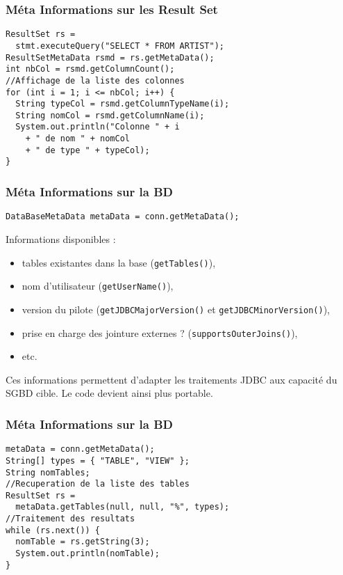 \documentclass[xcolor=pdftex,x11names,table]{beamer}
\begin{document}
		\begin{frame}[fragile]
    \frametitle{Méta Informations sur les Result Set}
      \begin{block}{}
    	  \begin{lstlisting}
ResultSet rs = 
  stmt.executeQuery("SELECT * FROM ARTIST");
ResultSetMetaData rsmd = rs.getMetaData();
int nbCol = rsmd.getColumnCount();
//Affichage de la liste des colonnes
for (int i = 1; i <= nbCol; i++) {
  String typeCol = rsmd.getColumnTypeName(i);
  String nomCol = rsmd.getColumnName(i);
  System.out.println("Colonne " + i 
    + " de nom " + nomCol 
    + " de type " + typeCol);
}
        \end{lstlisting}
			\end{block}
		\end{frame}
		
		\begin{frame}
    \frametitle{Méta Informations sur la BD}
      \begin{block}{}
        \lstinline$DataBaseMetaData metaData = conn.getMetaData();$
      \end{block}
      Informations disponibles :
    	\begin{itemize}
    		\item tables existantes dans la base (\lstinline$getTables()$),
    		\item nom d'utilisateur (\lstinline$getUserName()$),
    		\item version du pilote (\lstinline$getJDBCMajorVersion()$ et \lstinline$getJDBCMinorVersion()$),
    		\item prise en charge des jointure externes ? (\lstinline$supportsOuterJoins()$),
    		\item etc.
			\end{itemize}
			Ces informations permettent d'adapter les traitements JDBC aux capacité du SGBD cible. Le code devient ainsi plus 
			portable.
		\end{frame}
		
		\begin{frame}[fragile]
    \frametitle{Méta Informations sur la BD}
      \begin{block}{}
    	  \begin{lstlisting}
metaData = conn.getMetaData();
String[] types = { "TABLE", "VIEW" };
String nomTables;
//Recuperation de la liste des tables
ResultSet rs =
  metaData.getTables(null, null, "%", types);
//Traitement des resultats
while (rs.next()) {
  nomTable = rs.getString(3);
  System.out.println(nomTable);
}
        \end{lstlisting}
			\end{block}
		\end{frame}
	
\end{document}
